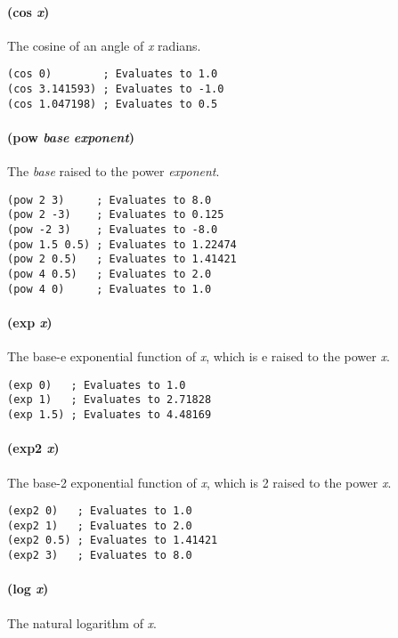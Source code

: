\documentclass[twoside=false, numbers=noenddot]{scrbook}
\begin{document}
\paragraph{(cos \emph{x})}
The cosine of an angle of \emph{x} radians.

\begin{verbatim}
(cos 0)        ; Evaluates to 1.0
(cos 3.141593) ; Evaluates to -1.0
(cos 1.047198) ; Evaluates to 0.5
\end{verbatim}

\paragraph{(pow \emph{base} \emph{exponent})}
The \emph{base} raised to the power \emph{exponent}.

\begin{verbatim}
(pow 2 3)     ; Evaluates to 8.0
(pow 2 -3)    ; Evaluates to 0.125
(pow -2 3)    ; Evaluates to -8.0
(pow 1.5 0.5) ; Evaluates to 1.22474
(pow 2 0.5)   ; Evaluates to 1.41421
(pow 4 0.5)   ; Evaluates to 2.0
(pow 4 0)     ; Evaluates to 1.0
\end{verbatim}

\paragraph{(exp \emph{x})}
The base-e exponential function of \emph{x}, which is e raised to the power \emph{x}.

\begin{verbatim}
(exp 0)   ; Evaluates to 1.0
(exp 1)   ; Evaluates to 2.71828
(exp 1.5) ; Evaluates to 4.48169
\end{verbatim}

\paragraph{(exp2 \emph{x})}
The base-2 exponential function of \emph{x}, which is 2 raised to the power \emph{x}.

\begin{verbatim}
(exp2 0)   ; Evaluates to 1.0
(exp2 1)   ; Evaluates to 2.0
(exp2 0.5) ; Evaluates to 1.41421
(exp2 3)   ; Evaluates to 8.0
\end{verbatim}

\paragraph{(log \emph{x})}
The natural logarithm of \emph{x}.
\end{document}
